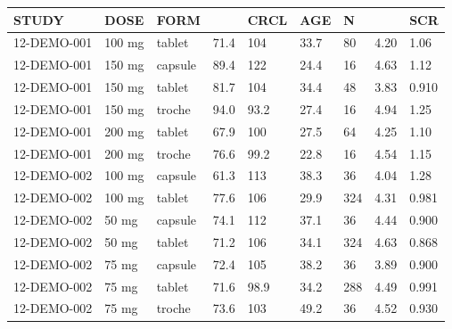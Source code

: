 {\def\arraystretch{1.4}\tabcolsep=5pt
\begin{threeparttable}
\begin{tabular}[h]{lllllllll}
\hline
STUDY & DOSE & FORM &  & CRCL & AGE & N &  & SCR \\
\hline
12-DEMO-001 & 100 mg & tablet & 71.4 & 104 & 33.7 & 80 & 4.20 & 1.06 \\
12-DEMO-001 & 150 mg & capsule & 89.4 & 122 & 24.4 & 16 & 4.63 & 1.12 \\
12-DEMO-001 & 150 mg & tablet & 81.7 & 104 & 34.4 & 48 & 3.83 & 0.910 \\
12-DEMO-001 & 150 mg & troche & 94.0 & 93.2 & 27.4 & 16 & 4.94 & 1.25 \\
12-DEMO-001 & 200 mg & tablet & 67.9 & 100 & 27.5 & 64 & 4.25 & 1.10 \\
12-DEMO-001 & 200 mg & troche & 76.6 & 99.2 & 22.8 & 16 & 4.54 & 1.15 \\
12-DEMO-002 & 100 mg & capsule & 61.3 & 113 & 38.3 & 36 & 4.04 & 1.28 \\
12-DEMO-002 & 100 mg & tablet & 77.6 & 106 & 29.9 & 324 & 4.31 & 0.981 \\
12-DEMO-002 & 50 mg & capsule & 74.1 & 112 & 37.1 & 36 & 4.44 & 0.900 \\
12-DEMO-002 & 50 mg & tablet & 71.2 & 106 & 34.1 & 324 & 4.63 & 0.868 \\
12-DEMO-002 & 75 mg & capsule & 72.4 & 105 & 38.2 & 36 & 3.89 & 0.900 \\
12-DEMO-002 & 75 mg & tablet & 71.6 & 98.9 & 34.2 & 288 & 4.49 & 0.991 \\
12-DEMO-002 & 75 mg & troche & 73.6 & 103 & 49.2 & 36 & 4.52 & 0.930 \\
\hline
\end{tabular}
\end{threeparttable}
}
